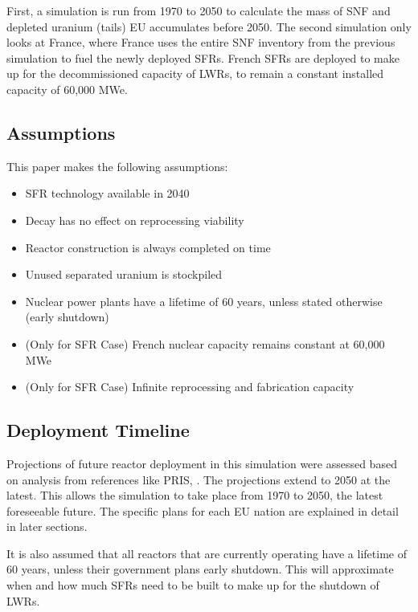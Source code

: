 First, a simulation is run from 1970 to 2050 to calculate the mass of 
\gls{SNF} and depleted uranium (tails) \gls{EU} accumulates before 2050. 
The second simulation only looks at France, where France
uses the entire \gls{SNF} inventory from the previous
simulation to fuel
the newly deployed \glspl{SFR}. French \gls{SFR}s are deployed
to make up for the decommissioned capacity of \gls{LWR}s, to
remain a constant installed capacity of 60,000 MWe.

\subsection{Assumptions}
This paper makes the following assumptions:
\begin{itemize}
        \item \gls{SFR} technology available in 2040
        \item Decay has no effect on reprocessing viability
        \item Reactor construction is always completed on time 
        \item Unused separated uranium is stockpiled
        \item Nuclear power plants have a lifetime of 60 years, unless stated otherwise (early shutdown)
        \item (Only for SFR Case) French nuclear capacity remains constant at 60,000 MWe
        \item (Only for SFR Case) Infinite reprocessing and fabrication capacity
\end{itemize}


\subsection{Deployment Timeline}
Projections of future reactor deployment in this simulation were
assessed based on analysis from references like \gls{PRIS},
\cite{world_nuclear_association_nuclear_2017} \cite{joskow_future_2012} \cite{hatch_politics_2015}.
The projections extend to 2050 at the latest. This allows the simulation to take place from
1970 to 2050, the latest foreseeable future. The specific plans for each \gls{EU} nation are explained
in detail in later sections.

It is also assumed that all reactors that are 
currently operating have a lifetime of 60 years, unless their government plans
early shutdown. This will approximate when and how much \glspl{SFR} need to be built
to make up for the shutdown of \glspl{LWR}.


